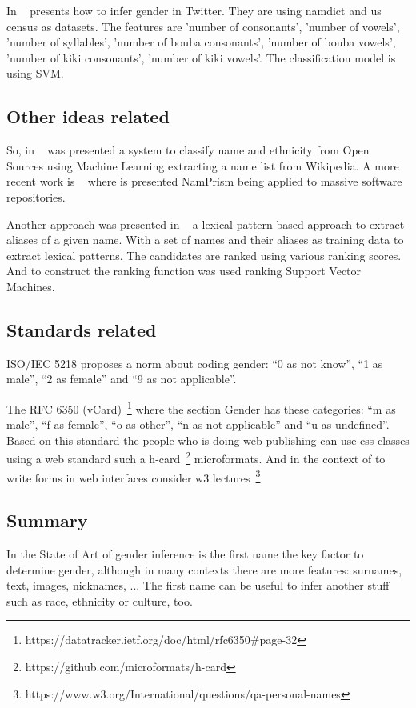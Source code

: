 \documentclass[a4paper]{article}
\begin{document}
In ~\cite{mueller2016gender} presents how to infer gender in
Twitter. They are using namdict and us census as datasets. The
features are 'number of consonants', 'number of vowels', 'number of
syllables', 'number of bouba consonants', 'number of bouba vowels',
'number of kiki consonants', 'number of kiki vowels'. The
classification model is using SVM.

\subsection{Other ideas related}

So, in ~\cite{ambekar2009name} was presented a system to classify name
and ethnicity from Open Sources using Machine Learning extracting a
name list from Wikipedia. A more recent work is
~\cite{nadri2021relationship} where is presented NamPrism being
applied to massive software repositories.

Another approach was presented in ~\cite{bollegala2010automatic} a
lexical-pattern-based approach to extract aliases of a given
name. With a set of names and their aliases as training data to
extract lexical patterns. The candidates are ranked using various
ranking scores. And to construct the ranking function was used
ranking Support Vector Machines.

\subsection{Standards related}

ISO/IEC 5218 proposes a norm about coding gender: ``0 as not know'',
``1 as male'', ``2 as female'' and ``9 as not applicable''.

The RFC 6350
(vCard)~\footnote{https://datatracker.ietf.org/doc/html/rfc6350#page-32}
where the section Gender has these categories: ``m as male'', ``f as
female'', ``o as other'', ``n as not applicable'' and ``u as
undefined''. Based on this standard the people who is doing web
publishing can use css classes using a web standard such a
h-card~\footnote{https://github.com/microformats/h-card}
microformats. And in the context of to write forms in web interfaces
consider w3
lectures~\footnote{https://www.w3.org/International/questions/qa-personal-names}

\subsection{Summary}

In the State of Art of gender inference is the first name the key
factor to determine gender, although in many contexts there are more
features: surnames, text, images, nicknames, ... The first name can be
useful to infer another stuff such as race, ethnicity or culture, too.
\end{document}
